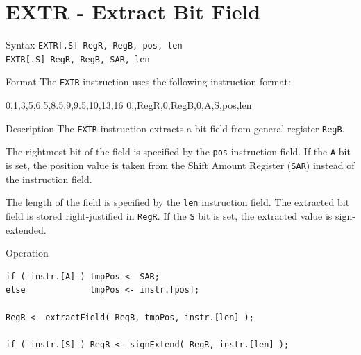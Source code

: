 %
%
\pagebreak
\section*{EXTR - Extract Bit Field}

\begin{iPageDescEntry}{Syntax}
\texttt{EXTR[.S] RegR, RegB, pos, len} \\
\texttt{EXTR[.S] RegR, RegB, SAR, len}
\end{iPageDescEntry}

\begin{iPageDescEntry}{Format}
The \texttt{EXTR} instruction uses the following instruction format: \\

\begin{flushleft}
\drawInstrFormat
    {0,1,3,5,6.5,8.5,9,9.5,10,13,16}
    {0,\OpCodeEXTR,RegR,0,RegB,0,A,S,pos,len}
\end{flushleft}
\end{iPageDescEntry}

\begin{iPageDescEntry}{Description}
The \texttt{EXTR} instruction extracts a bit field from general register \texttt{RegB}.  

The rightmost bit of the field is specified by the \texttt{pos} instruction field. If the \texttt{A} bit is set, the position value is taken from the Shift Amount Register (\texttt{SAR}) instead of the instruction field.

The length of the field is specified by the \texttt{len} instruction field. The extracted bit field is stored right-justified in \texttt{RegR}. If the \texttt{S} bit is set, the extracted value is sign-extended.  

\end{iPageDescEntry}

\begin{iPageDescOpEntry}{Operation}
\begin{lstlisting}[style=iPageOpStyle]
if ( instr.[A] ) tmpPos <- SAR; 
else             tmpPos <- instr.[pos];

RegR <- extractField( RegB, tmpPos, instr.[len] );

if ( instr.[S] ) RegR <- signExtend( RegR, instr.[len] );
\end{lstlisting}
\end{iPageDescOpEntry}


